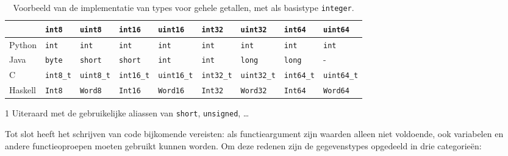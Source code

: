\begin{table}
    \centering
    \caption{Voorbeeld van de implementatie van types voor gehele getallen, met als basistype \texttt{integer}.}
    \label{tab:vertaling}
    \begin{threeparttable}
        \begin{tabular}{|l|llllllll|}
            \hline
            & \texttt{int8} & \texttt{uint8} & \texttt{int16} & \texttt{uint16} & \texttt{int32} & \texttt{uint32} & \texttt{int64} & \texttt{uint64} \\
            \hline
            Python     & \texttt{int}  & \texttt{int}   & \texttt{int}   & \texttt{int}    & \texttt{int}   & \texttt{int}    & \texttt{int}   & \texttt{int}    \\
            Java       & \texttt{byte} & \texttt{short} & \texttt{short} & \texttt{int}    & \texttt{int}   & \texttt{long}   & \texttt{long}  & -               \\
            C\tnote{1} & \texttt{int8\_t} & \texttt{uint8\_t} & \texttt{int16\_t} & \texttt{uint16\_t} & \texttt{int32\_t} & \texttt{uint32\_t} & \texttt{int64\_t} & \texttt{uint64\_t} \\
            Haskell    & \texttt{Int8} & \texttt{Word8} & \texttt{Int16} & \texttt{Word16} & \texttt{Int32} & \texttt{Word32} & \texttt{Int64} & \texttt{Word64} \\
            \hline
        \end{tabular}
        \begin{tablenotes}
            \item[1] Uiteraard met de gebruikelijke aliassen van \texttt{short}, \texttt{unsigned}, \ldots
        \end{tablenotes}
    \end{threeparttable}
\end{table}

Tot slot heeft het schrijven van code bijkomende vereisten: als functieargument zijn waarden alleen niet voldoende, ook variabelen en andere functieoproepen moeten gebruikt kunnen worden.
Om deze redenen zijn de gegevenstypes opgedeeld in drie categorieën:

